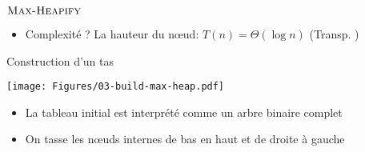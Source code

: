 \begin{frame}{$\textnormal{\scshape Max-Heapify}$}

\begin{center}
\begin{small}
\end{small}
\end{center}

\bigskip

\begin{itemize}
\item Complexité ? La hauteur du n\oe ud: $T(n)=\Theta(\log n)$ (Transp. \pageref{03:hauteurtas})
\end{itemize}
\end{frame}

\begin{frame}{Construction d'un tas}

\begin{center}
\end{center}

\bigskip

\centerline{\texttt{[image: Figures/03-build-max-heap.pdf]}}

\bigskip

\begin{itemize}
\item La tableau initial est interprété comme un arbre binaire complet
\item On tasse les n\oe uds internes de bas en haut et de droite à gauche
\end{itemize}


\end{frame}


